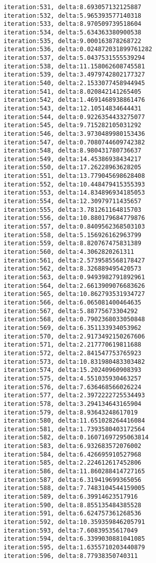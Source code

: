 \documentclass[11pt]{article}
\begin{document}
\begin{Verbatim}[commandchars=\\\{\}]
iteration:531, delta:8.693057132125887
iteration:532, delta:5.965393577140318
iteration:533, delta:8.970509739518604
iteration:534, delta:5.634363380900538
iteration:535, delta:9.000163878268722
iteration:536, delta:0.024872031899761282
iteration:537, delta:5.0437531555539294
iteration:538, delta:11.158062608745581
iteration:539, delta:3.4979742802177327
iteration:540, delta:2.1533077458944945
iteration:541, delta:8.020842141265405
iteration:542, delta:1.4691468938861476
iteration:543, delta:12.10514834644431
iteration:544, delta:0.9226354433275077
iteration:545, delta:9.715282105031292
iteration:546, delta:3.9730489980153436
iteration:547, delta:0.7080744609742382
iteration:548, delta:8.980431780736637
iteration:549, delta:14.45386938434217
iteration:550, delta:17.26228963628205
iteration:551, delta:13.779045698628408
iteration:552, delta:10.448479415355393
iteration:553, delta:14.834896934185053
iteration:554, delta:12.30979711435657
iteration:555, delta:3.781261164815703
iteration:556, delta:10.880179684779876
iteration:557, delta:0.8409562368503103
iteration:558, delta:5.156926162963799
iteration:559, delta:8.820767475831389
iteration:560, delta:4.3062820261311
iteration:561, delta:2.5739585568178427
iteration:562, delta:8.326889495420573
iteration:563, delta:0.9493982791892961
iteration:564, delta:2.6613909076683626
iteration:565, delta:10.862793531934727
iteration:566, delta:6.065081400464635
iteration:567, delta:5.88775673304292
iteration:568, delta:0.7902368033050848
iteration:569, delta:6.351133934053962
iteration:570, delta:2.9173492150267606
iteration:571, delta:2.217770619811688
iteration:572, delta:2.841547753765923
iteration:573, delta:10.831980483303482
iteration:574, delta:15.20240960908393
iteration:575, delta:4.551035930463257
iteration:576, delta:7.636468566026224
iteration:577, delta:2.3972222725534493
iteration:578, delta:3.294134643165904
iteration:579, delta:8.93643248617019
iteration:580, delta:11.651028264416084
iteration:581, delta:1.7393580403172564
iteration:582, delta:0.16071697295063814
iteration:583, delta:6.932683572076002
iteration:584, delta:6.426695910527968
iteration:585, delta:2.224612617452806
iteration:586, delta:11.860288414727165
iteration:587, delta:6.319419699365056
iteration:588, delta:7.7483104544159005
iteration:589, delta:6.39914623517916
iteration:590, delta:8.855135484385528
iteration:591, delta:6.624757361268536
iteration:592, delta:10.359359846205791
iteration:593, delta:7.60839535617049
iteration:594, delta:6.3399030881041085
iteration:595, delta:1.6355710203440879
iteration:596, delta:8.77938350740311

\end{Verbatim}
\end{document}
